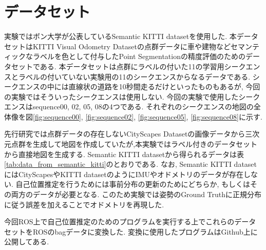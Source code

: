 \section{データセット}\label{sec:dataset}
実験ではボン大学が公表しているSemantic KITTI dataset\cite{semantic_kitti_dataset_paper}\cite{semantic_kitti_dataset_link}を使用した. 本データセットはKITTI Visual Odometry Dataset\cite{Geiger2012CVPR}の点群データに車や建物などセマンティックなラベルを色として付与したPoint Segmentationの精度評価のためのデータセットである. 本データセットは点群にラベルの付いた11の学習用シークエンスとラベルの付いていない実験用の11のシークエンスからなるデータである. シークエンスの中には直線状の道路を10秒間走るだけといったものもあるが, 今回の実験ではそういったシークエンスは使用しない. 今回の実験で使用したシークエンスはsequence00, 02, 05, 08の4つである. それぞれのシークエンスの地図の全体像を図\ref{fig:sequence00}, \ref{fig:sequence02}, \ref{fig:sequence05}, \ref{fig:sequence08}に示す. \par 先行研究\cite{semantic_point_localization}では点群データの存在しないCityScapes Dataset\cite{CityScapes_paper}\cite{CityScapes_link}の画像データから三次元点群を生成して地図を作成していたが,本実験ではラベル付きのデータセットから直接地図を生成する. Semantic KITTI datasetから得られるデータは表\ref{tab:data_from_semantic_kitti}のとおりである. なお, Semantic KITTI datasetにはCityScapesやKITTI dataset\cite{KITTI_dataset_paper}のようにIMUやオドメトリのデータが存在しない. 自己位置推定を行うためには事前分布の更新のためにどちらか, もしくはその両方のデータが必要となる. このため実験では姿勢のGround Truthに正規分布に従う誤差を加えることでオドメトリを再現した. \par 今回ROS上で自己位置推定のためのプログラムを実行する上でこれらのデータセットをROSのbagデータに変換した. 変換に使用したプログラムはGithub上に公開してある\cite{semantickitti2bag}.

